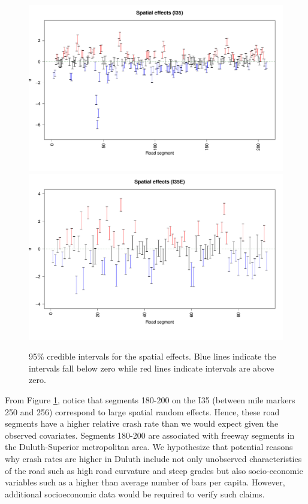 \begin{figure}[h]
\centering
\includegraphics[width=.90\textwidth]{35spatial.pdf}
\includegraphics[width=.90\textwidth]{35espatial.pdf}
\caption{95\% credible intervals for the spatial effects. Blue lines indicate the intervals fall below zero while red lines indicate intervals are above zero. }
\label{spatial}
\end{figure}

From Figure \ref{spatial}, notice that segments 180-200 on the I35 (between mile markers 250 and 256) correspond to large spatial random effects. Hence,  these road segments have a higher relative crash rate than we would expect given the observed covariates. Segments 180-200 are associated with freeway segments in the Duluth-Superior metropolitan area. We hypothesize that potential reasons why crash rates are higher in Duluth include not only unobserved characteristics of the road such as high road curvature and steep grades but also  socio-economic variables such as a higher than average number of bars per capita.  However, additional socioeconomic data would be required to verify such claims.


